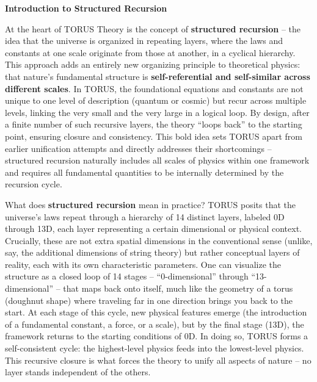 \documentclass[]{article}
\begin{document}
\textbf{Introduction to Structured Recursion}

At the heart of TORUS Theory is the concept of \textbf{structured
recursion} -- the idea that the universe is organized in repeating
layers, where the laws and constants at one scale originate from those
at another, in a cyclical hierarchy. This approach adds an entirely new
organizing principle to theoretical physics: that nature's fundamental
structure is \textbf{self-referential and self-similar across different
scales}. In TORUS, the foundational equations and constants are not
unique to one level of description (quantum or cosmic) but recur across
multiple levels, linking the very small and the very large in a logical
loop. By design, after a finite number of such recursive layers, the
theory ``loops back'' to the starting point, ensuring closure and
consistency. This bold idea sets TORUS apart from earlier unification
attempts and directly addresses their shortcomings -- structured
recursion naturally includes all scales of physics within one framework
and requires all fundamental quantities to be internally determined by
the recursion cycle.

What does \textbf{structured recursion} mean in practice? TORUS posits
that the universe's laws repeat through a hierarchy of 14 distinct
layers, labeled 0D through 13D, each layer representing a certain
dimensional or physical context. Crucially, these are not extra spatial
dimensions in the conventional sense (unlike, say, the additional
dimensions of string theory) but rather conceptual layers of reality,
each with its own characteristic parameters. One can visualize the
structure as a closed loop of 14 stages -- ``0-dimensional'' through
``13-dimensional'' -- that maps back onto itself, much like the geometry
of a torus (doughnut shape) where traveling far in one direction brings
you back to the start. At each stage of this cycle, new physical
features emerge (the introduction of a fundamental constant, a force, or
a scale), but by the final stage (13D), the framework returns to the
starting conditions of 0D. In doing so, TORUS forms a self-consistent
cycle: the highest-level physics feeds into the lowest-level physics.
This recursive closure is what forces the theory to unify all aspects of
nature -- no layer stands independent of the others.
\end{document}
